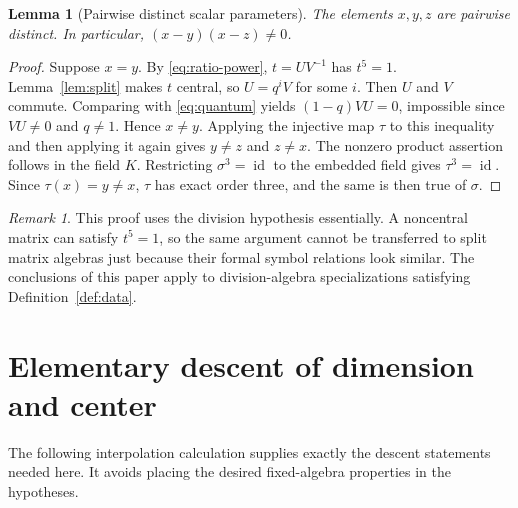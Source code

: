 \documentclass[11pt,letterpaper]{article}
\newtheorem{lemma}[theorem]{Lemma}
\theoremstyle{definition}
\theoremstyle{remark}
\newtheorem{remark}[theorem]{Remark}
\newcommand{\id}{\operatorname{id}}
\begin{document}
\begin{lemma}[Pairwise distinct scalar parameters]\label{lem:distinct}
The elements $x,y,z$ are pairwise distinct. In particular,
$(x-y)(x-z)\ne0$.
\end{lemma}
\begin{proof}
Suppose $x=y$. By \eqref{eq:ratio-power}, $t=UV^{-1}$ has $t^5=1$.
Lemma~\ref{lem:split} makes $t$ central, so $U=q^iV$ for some $i$.
Then $U$ and $V$ commute. Comparing with \eqref{eq:quantum} yields
$(1-q)VU=0$, impossible since $VU\ne0$ and $q\ne1$. Hence $x\ne y$.
Applying the injective map $\tau$ to this inequality and then applying it
again gives $y\ne z$ and $z\ne x$. The nonzero product assertion follows
in the field $K$. Restricting $\sigma^3=\id$ to the embedded field gives
$\tau^3=\id$. Since $\tau(x)=y\ne x$, $\tau$ has exact order three,
and the same is then true of $\sigma$.
\end{proof}

\begin{remark}
This proof uses the division hypothesis essentially. A noncentral matrix
can satisfy $t^5=1$, so the same argument cannot be transferred to split
matrix algebras just because their formal symbol relations look similar.
The conclusions of this paper apply to division-algebra specializations
satisfying Definition~\ref{def:data}.
\end{remark}

\section{Elementary descent of dimension and center}\label{sec:descent}

The following interpolation calculation supplies exactly the descent
statements needed here. It avoids placing the desired fixed-algebra
properties in the hypotheses.
\end{document}
